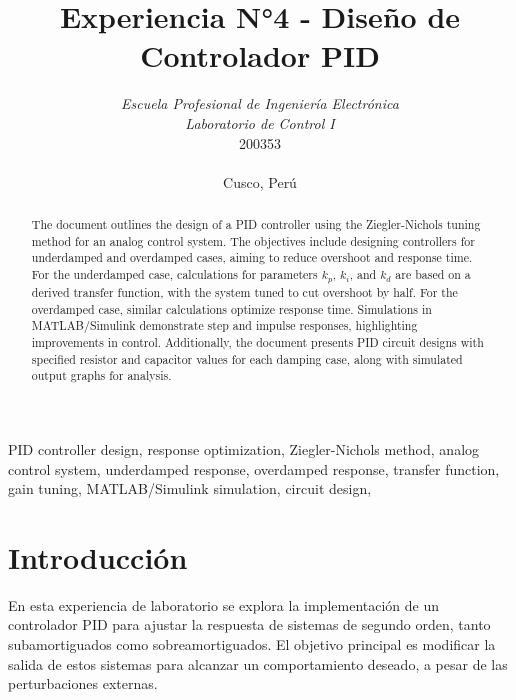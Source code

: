 \documentclass[conference]{IEEEtran}
\begin{document}
	
	\title{Experiencia N°4 - Diseño de Controlador PID}
	\author{	
		\textit{Escuela Profesional de Ingeniería Electrónica}\\
		\textit{Laboratorio de Control I}\\
		200353 \\\\
		Cusco, Perú
	}
	
	\maketitle
	
	\begin{abstract}
		The document outlines the design of a PID controller using the Ziegler-Nichols tuning method for an analog control system. The objectives include designing controllers for underdamped and overdamped cases, aiming to reduce overshoot and response time. For the underdamped case, calculations for parameters \( k_p \), \( k_i \), and \( k_d \) are based on a derived transfer function, with the system tuned to cut overshoot by half. For the overdamped case, similar calculations optimize response time. Simulations in MATLAB/Simulink demonstrate step and impulse responses, highlighting improvements in control. Additionally, the document presents PID circuit designs with specified resistor and capacitor values for each damping case, along with simulated output graphs for analysis.
	\end{abstract}
	
	\begin{IEEEkeywords}
		PID controller design, response optimization, Ziegler-Nichols method, analog control system, underdamped response, overdamped response, transfer function, gain tuning, MATLAB/Simulink simulation, circuit design, 
	\end{IEEEkeywords}
	
	\section{Introducción}
	En esta experiencia de laboratorio se explora la implementación de un controlador PID para ajustar la respuesta de sistemas de segundo orden, tanto subamortiguados como sobreamortiguados. El objetivo principal es modificar la salida de estos sistemas para alcanzar un comportamiento deseado, a pesar de las perturbaciones externas.
	
\end{document}
